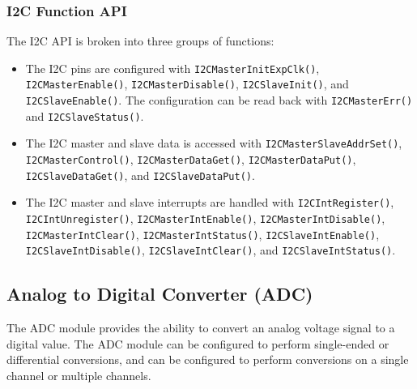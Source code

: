 \documentclass{article}
\begin{document}
\subsubsection{I2C Function API}
The I2C API is broken into three groups of functions:
\begin{itemize}
    \item The I2C pins are configured with
          \texttt{I2CMasterInitExpClk()},
          \texttt{I2CMasterEnable()},
          \texttt{I2CMasterDisable()},
          \texttt{I2CSlaveInit()}, and
          \texttt{I2CSlaveEnable()}. The configuration can be
          read back with \texttt{I2CMasterErr()} and
          \texttt{I2CSlaveStatus()}.
    \item The I2C master and slave data is accessed with
          \texttt{I2CMasterSlaveAddrSet()},
          \texttt{I2CMasterControl()},
          \texttt{I2CMasterDataGet()},
          \texttt{I2CMasterDataPut()},
          \texttt{I2CSlaveDataGet()}, and
          \texttt{I2CSlaveDataPut()}.
    \item The I2C master and slave interrupts are handled with
          \texttt{I2CIntRegister()},
          \texttt{I2CIntUnregister()},
          \texttt{I2CMasterIntEnable()},
          \texttt{I2CMasterIntDisable()},
          \texttt{I2CMasterIntClear()},
          \texttt{I2CMasterIntStatus()},
          \texttt{I2CSlaveIntEnable()},
          \texttt{I2CSlaveIntDisable()},
          \texttt{I2CSlaveIntClear()}, and
          \texttt{I2CSlaveIntStatus()}.
\end{itemize}
\subsection{Analog to Digital Converter (ADC)}
The ADC module provides the ability to convert an analog voltage signal
to a digital value. The ADC module can be configured to perform
single-ended or differential conversions, and can be configured to
perform conversions on a single channel or multiple channels.
\end{document}
